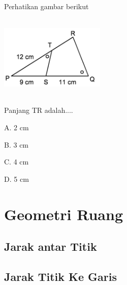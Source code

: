 \documentclass[11pt,fleqn]{book} %
\begin{document}
Perhatikan gambar berikut

\includegraphics[width = 5cm, height= 4cm]{Pictures/a45.png}

Panjang TR adalah....

A. 2 cm

B. 3 cm

C. 4 cm

D. 5 cm




\chapter{Geometri Ruang}
\section{Jarak antar Titik}

\section{Jarak Titik Ke Garis}
\end{document}
